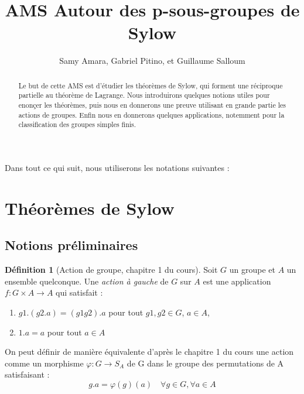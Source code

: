 \documentclass{article}
\title{AMS Autour des p-sous-groupes de Sylow}
\author{Samy Amara, Gabriel Pitino, et Guillaume Salloum}
\date{}
\theoremstyle{definition}
\newtheorem{definition}[subsubsection]{Définition}
\theoremstyle{plain}
\theoremstyle{plain}
\theoremstyle{plain}
\theoremstyle{plain}
\theoremstyle{definition}
\theoremstyle{plain}
\theoremstyle{plain}
\begin{document}
\maketitle

\begin{abstract}
	Le but de cette AMS est d'étudier les théorèmes de Sylow, qui forment une réciproque partielle au théorème de Lagrange.
	Nous introduirons quelques notions utiles pour enonçer les théorèmes, puis nous en donnerons une preuve utilisant en grande partie les actions de groupes.
	Enfin nous en donnerons quelques applications, notemment pour la classification des groupes simples finis.%
\end{abstract}



\tableofcontents
\clearpage

Dans tout ce qui suit, nous utiliserons les notations suivantes :
\glsaddall
\renewcommand*{\arraystretch}{1.2} %
\printnoidxglossary[title=Notations,type=symbols,style=long,sort=standard,nonumberlist]

\clearpage


\section{Théorèmes de Sylow}
\subsection{Notions préliminaires}


\begin{definition}[Action de groupe, chapitre 1 du cours]
	Soit \( G \) un groupe et \( A \) un ensemble quelconque. Une \textit{action à gauche} de \( G \) sur \( A \) est une application \( f : G \times A \rightarrow A\) qui satisfait :
	\begin{enumerate}[label = (\roman*)]
		\item \(g1.(g2.a) = (g1g2).a \) pour tout \(g1,g2 \in G\), \(a \in A\),
		\item \(1.a = a\) pour tout \(a \in A\)
	\end{enumerate}

	On peut définir de manière équivalente d'après le chapitre 1 du cours une action comme un morphisme \( \varphi : G \rightarrow S_{A} \) de G dans le groupe des permutations de A satisfaisant :
	\begin{equation}
		g.a = \varphi(g)(a) \quad \forall g \in G, \forall a \in A
	\end{equation}
\end{definition}
\end{document}
